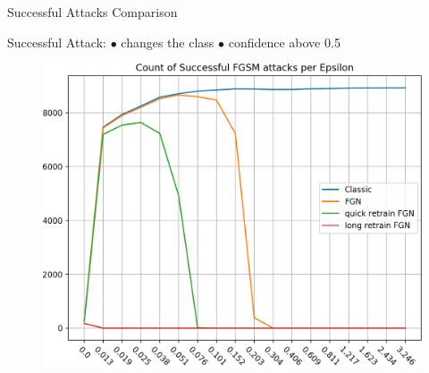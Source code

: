 \documentclass{beamer}
\begin{document}
\begin{frame}{Successful Attacks Comparison}
    \begin{block}{}
        Successful Attack: $\bullet$ changes the class $\bullet$ confidence above 0.5
    \end{block}
    \begin{figure}
        \centering
        \includegraphics[width=.88\textheight]{images/successful-attacks-comparisons/succesful_fgsm_count.png}
    \end{figure}
\end{frame}
\end{document}
